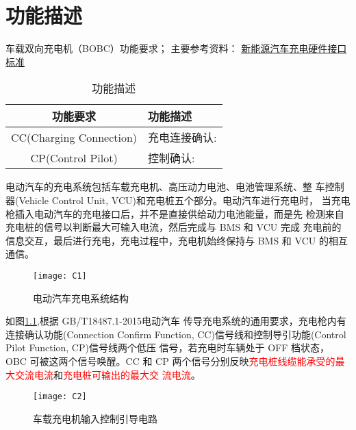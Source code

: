 
\chapter{功能描述}

车载双向充电机（BOBC）功能要求；
主要参考资料：
\href{https://blog.csdn.net/hadywell/article/details/128699869?utm_medium=distribute.pc_relevant.none-task-blog-2~default~baidujs_utm_term~default-5-128699869-blog-112810903.235^v43^control&spm=1001.2101.3001.4242.4&utm_relevant_index=8}{新能源汽车充电硬件接口标准}

\begin{table}[h]
    \centering
    \caption{功能描述}
    \renewcommand{\arraystretch}{1.3}
    \begin{tabular}{|c|l|}
        \hline
        \cellcolor{yellow} 功能要求 & \cellcolor{yellow}功能描述\\
        \hline
        CC(Charging Connection)&充电连接确认:\\
        \hline
        CP(Control Pilot)&控制确认:\\
        \hline
    \end{tabular}
\end{table}


电动汽车的充电系统包括车载充电机、高压动力电池、电池管理系统、整
车控制器(Vehicle Control Unit, VCU)和充电桩五个部分。电动汽车进行充电时，
当充电枪插入电动汽车的充电接口后，并不是直接供给动力电池能量，而是先
检测来自充电桩的信号以判断最大可输入电流，然后完成与 BMS 和 VCU 完成
充电前的信息交互，最后进行充电，充电过程中，充电机始终保持与 BMS 和
VCU 的相互通信。
    \begin{figure}[!htbp]
        \centering
        \texttt{[image: C1]}
        \caption{电动汽车充电系统结构}
        \label{fig:C1}
    \end{figure}

如图\ref{fig:C1},根据 GB/T18487.1-2015\cite{GB18487_1}电动汽车
传导充电系统的通用要求，充电枪内有连接确认功能(Connection Confirm
Function, CC)信号线和控制导引功能(Control Pilot Function, CP)信号线两个低压
信号，若充电时车辆处于 OFF 档状态，OBC 可被这两个信号唤醒。CC 和 CP
两个信号分别反映\textcolor{red}{充电桩线缆能承受的最大交流电流}和\textcolor{red}{充电桩可输出的最大交
流电流}。

    \begin{figure}[!htbp]
        \centering
        \texttt{[image: C2]}
        \caption{车载充电机输入控制引导电路}
        \label{fig:C2}
    \end{figure}




